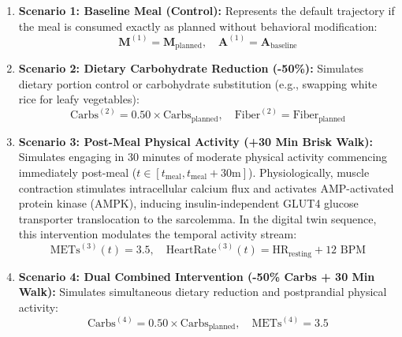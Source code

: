 \begin{enumerate}
    \item \textbf{Scenario 1: Baseline Meal (Control):}
    Represents the default trajectory if the meal is consumed exactly as planned without behavioral modification:
    \begin{equation}
        \mathbf{M}^{(1)} = \mathbf{M}_{\text{planned}}, \quad \mathbf{A}^{(1)} = \mathbf{A}_{\text{baseline}}
    \end{equation}
    
    \item \textbf{Scenario 2: Dietary Carbohydrate Reduction (-50\%):}
    Simulates dietary portion control or carbohydrate substitution (e.g., swapping white rice for leafy vegetables):
    \begin{equation}
        \text{Carbs}^{(2)} = 0.50 \times \text{Carbs}_{\text{planned}}, \quad \text{Fiber}^{(2)} = \text{Fiber}_{\text{planned}}
    \end{equation}
    
    \item \textbf{Scenario 3: Post-Meal Physical Activity (+30 Min Brisk Walk):}
    Simulates engaging in 30 minutes of moderate physical activity commencing immediately post-meal ($t \in [t_{\text{meal}}, t_{\text{meal}}+30\text{m}]$). Physiologically, muscle contraction stimulates intracellular calcium flux and activates AMP-activated protein kinase (AMPK), inducing insulin-independent GLUT4 glucose transporter translocation to the sarcolemma. In the digital twin sequence, this intervention modulates the temporal activity stream:
    \begin{equation}
        \text{METs}^{(3)}(t) = 3.5, \quad \text{HeartRate}^{(3)}(t) = \text{HR}_{\text{resting}} + 12\text{ BPM}
    \end{equation}
    
    \item \textbf{Scenario 4: Dual Combined Intervention (-50\% Carbs + 30 Min Walk):}
    Simulates simultaneous dietary reduction and postprandial physical activity:
    \begin{equation}
        \text{Carbs}^{(4)} = 0.50 \times \text{Carbs}_{\text{planned}}, \quad \text{METs}^{(4)} = 3.5
    \end{equation}
\end{enumerate}

